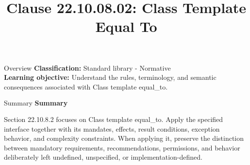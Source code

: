 \documentclass[10pt,letterpaper]{article}
\title{Clause 22.10.08.02: Class Template Equal To}
\author{}
\date{}
\begin{document}
\maketitle
\begin{CornellOverviewBox}{Overview}
\textbf{Classification:} Standard library - Normative\\[2pt]
\textbf{Learning objective:} Understand the rules, terminology, and semantic consequences associated with Class template equal\_to.
\end{CornellOverviewBox}\begin{CornellSummaryBox}{Summary}
{\sffamily\bfseries\color{Accent} Summary}\par\vspace{3pt}Section 22.10.8.2 focuses on Class template equal\_to. Apply the specified interface together with its mandates, effects, result conditions, exception behavior, and complexity constraints. When applying it, preserve the distinction between mandatory requirements, recommendations, permissions, and behavior deliberately left undefined, unspecified, or implementation-defined.
\end{CornellSummaryBox}
\end{document}
